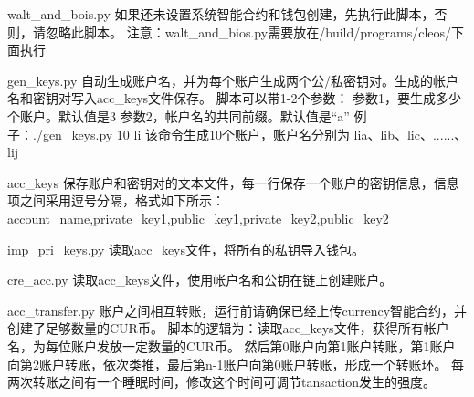 walt\+\_\+and\+\_\+bois.\+py 如果还未设置系统智能合约和钱包创建，先执行此脚本，否则，请忽略此脚本。 注意：walt\+\_\+and\+\_\+bios.\+py需要放在/build/programs/cleos/下面执行

gen\+\_\+keys.\+py 自动生成账户名，并为每个账户生成两个公/私密钥对。生成的帐户名和密钥对写入acc\+\_\+keys文件保存。 脚本可以带1-\/2个参数： 参数1，要生成多少个账户。默认值是3 参数2，帐户名的共同前缀。默认值是“a” 例子：./gen\+\_\+keys.py 10 li 该命令生成10个账户，账户名分别为 lia、lib、lic、......、lij

acc\+\_\+keys 保存账户和密钥对的文本文件，每一行保存一个账户的密钥信息，信息项之间采用逗号分隔，格式如下所示： account\+\_\+name,private\+\_\+key1,public\+\_\+key1,private\+\_\+key2,public\+\_\+key2

imp\+\_\+pri\+\_\+keys.\+py 读取acc\+\_\+keys文件，将所有的私钥导入钱包。

cre\+\_\+acc.\+py 读取acc\+\_\+keys文件，使用帐户名和公钥在链上创建账户。

acc\+\_\+transfer.\+py 账户之间相互转账，运行前请确保已经上传currency智能合约，并创建了足够数量的\+C\+U\+R币。 脚本的逻辑为：读取acc\+\_\+keys文件，获得所有帐户名，为每位账户发放一定数量的\+C\+U\+R币。 然后第0账户向第1账户转账，第1账户向第2账户转账，依次类推，最后第n-\/1账户向第0账户转账，形成一个转账环。 每两次转账之间有一个睡眠时间，修改这个时间可调节tansaction发生的强度。 